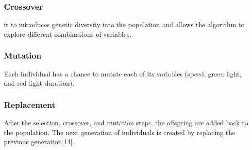  \subsubsection{Crossover}
 it to introduces genetic diversity into the population and allows the algorithm to explore different combinations of variables.
 \subsubsection{Mutation}
 Each individual has a chance to mutate each of its variables (speed, green light, and red light duration).
 \subsubsection{Replacement}
 After the selection, crossover, and mutation steps, the offspring are added back to the population. The next generation of individuals is created by replacing the previous generation[14].

